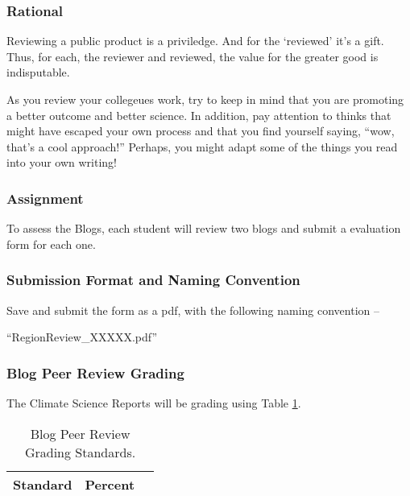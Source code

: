 
\subsubsection{Rational}

Reviewing a public product is a priviledge. And for the `reviewed' it's a gift. Thus, for each, the reviewer and reviewed, the value for the greater good is indisputable. 

As you review your collegeues work, try to keep in mind that you are promoting a better outcome and better science. In addition, pay attention to thinks that might have escaped your own process and that you find yourself saying, ``wow, that's a cool approach!''  Perhaps, you might adapt some of the things you read into your own writing!

\subsubsection{Assignment}

To assess the Blogs, each student will review two blogs and submit a evaluation form for each one. 

\subsubsection{Submission Format and Naming Convention}

Save and submit the form as a pdf, with the following naming convention -- 

``RegionReview\_XXXXX.pdf''

\subsubsection{Blog Peer Review Grading}

The Climate Science Reports will be grading using Table \ref{tab:blogpeerreviewgrading}. 

\begin{table}[h]
\caption{Blog Peer Review Grading Standards.}
\label{tab:blogpeerreviewgrading}
\begin{tabular}{lll}\hline
Standard      &   Percent   & \\ \hline\hline
\hline
\end{tabular}
\end{table}

